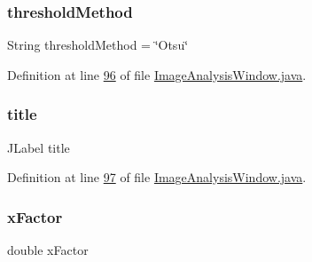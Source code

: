 \hypertarget{classgui_1_1_image_analysis_window_a00af632f76a9750b3b0dcf702d1d30a8}{}\label{classgui_1_1_image_analysis_window_a00af632f76a9750b3b0dcf702d1d30a8} 
\subsubsection{\texorpdfstring{threshold\+Method}{thresholdMethod}}
{\footnotesize\ttfamily String threshold\+Method = \char`\"{}Otsu\char`\"{}\hspace{0.3cm}{\ttfamily [protected]}}



Definition at line \hyperlink{_image_analysis_window_8java_source_l00096}{96} of file \hyperlink{_image_analysis_window_8java_source}{Image\+Analysis\+Window.\+java}.

\hypertarget{classgui_1_1_image_analysis_window_aceabe99400c9a27b60ab97a773981bbe}{}\label{classgui_1_1_image_analysis_window_aceabe99400c9a27b60ab97a773981bbe} 
\subsubsection{\texorpdfstring{title}{title}}
{\footnotesize\ttfamily J\+Label title\hspace{0.3cm}{\ttfamily [private]}}



Definition at line \hyperlink{_image_analysis_window_8java_source_l00097}{97} of file \hyperlink{_image_analysis_window_8java_source}{Image\+Analysis\+Window.\+java}.

\hypertarget{classgui_1_1_image_analysis_window_adb607f30ce4997349a99dca08d813585}{}\label{classgui_1_1_image_analysis_window_adb607f30ce4997349a99dca08d813585} 
\subsubsection{\texorpdfstring{x\+Factor}{xFactor}}
{\footnotesize\ttfamily double x\+Factor\hspace{0.3cm}{\ttfamily [protected]}}



